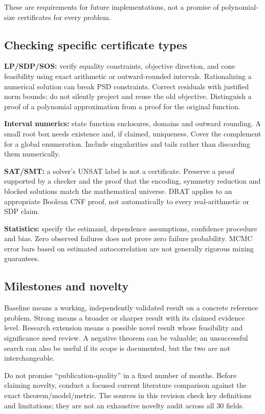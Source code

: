 \documentclass[
  11pt,
]{article}
\begin{document}
These are requirements for future implementations, not a promise of
polynomial-size certificates for every problem.

\subsection{Checking specific certificate types}

\textbf{LP/SDP/SOS:} verify equality constraints, objective direction,
and cone feasibility using exact arithmetic or outward-rounded
intervals. Rationalizing a numerical solution can break PSD constraints.
Correct residuals with justified norm bounds; do not silently project
and reuse the old objective. Distinguish a proof of a polynomial
approximation from a proof for the original function.

\textbf{Interval numerics:} state function enclosures, domains and
outward rounding. A small root box needs existence and, if claimed,
uniqueness. Cover the complement for a global enumeration. Include
singularities and tails rather than discarding them numerically.

\textbf{SAT/SMT:} a solver's UNSAT label is not a certificate. Preserve
a proof supported by a checker and the proof that the encoding, symmetry
reduction and blocked solutions match the mathematical universe. DRAT
applies to an appropriate Boolean CNF proof, not automatically to every
real-arithmetic or SDP claim.

\textbf{Statistics:} specify the estimand, dependence assumptions,
confidence procedure and bias. Zero observed failures does not prove
zero failure probability. MCMC error bars based on estimated
autocorrelation are not generally rigorous mixing guarantees.

\subsection{Milestones and novelty}

Baseline means a working, independently validated result on a concrete
reference problem. Strong means a broader or sharper result with its
claimed evidence level. Research extension means a possible novel result
whose feasibility and significance need review. A negative theorem can
be valuable; an unsuccessful search can also be useful if its scope is
documented, but the two are not interchangeable.

Do not promise ``publication-quality'' in a fixed number of months.
Before claiming novelty, conduct a focused current literature comparison
against the exact theorem/model/metric. The sources in this revision
check key definitions and limitations; they are not an exhaustive
novelty audit across all 30 fields.
\end{document}
